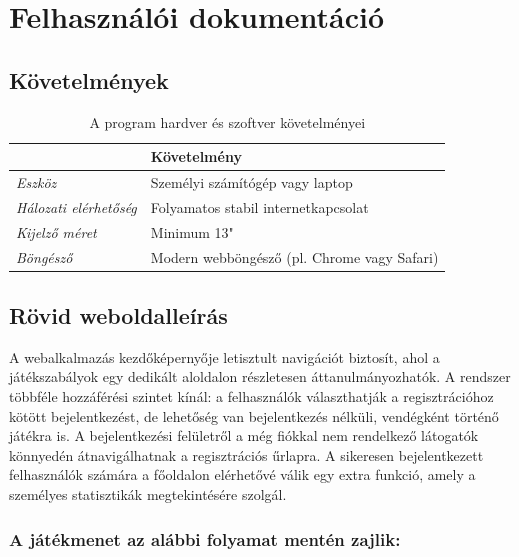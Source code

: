 \chapter{Felhasználói dokumentáció}
\label{ch:user}

\section{Követelmények}

\begin{table}[H]
	\centering
	\begin{tabular}{ | m{} | m{} | }
		\hline
		\textbf{} & \textbf{Követelmény} \\
		\hline \hline
		\emph{Eszköz} & Személyi számítógép vagy laptop \\
		\hline
		\emph{Hálozati elérhetőség} &  Folyamatos stabil internetkapcsolat \\
		\hline
		\emph{Kijelző méret} & Minimum 13" \\
		\hline
		\emph{Böngésző} & Modern webböngésző (pl. Chrome vagy Safari) \\
		\hline

	\end{tabular}
	\caption{A program hardver és szoftver követelményei}
	\label{tab:example-1}
\end{table}

\section{Rövid weboldalleírás}

A webalkalmazás kezdőképernyője letisztult navigációt biztosít, ahol a játékszabályok egy dedikált aloldalon részletesen áttanulmányozhatók. A rendszer többféle hozzáférési szintet kínál: a felhasználók választhatják a regisztrációhoz kötött bejelentkezést, de lehetőség van bejelentkezés nélküli, vendégként történő játékra is. A bejelentkezési felületről a még fiókkal nem rendelkező látogatók könnyedén átnavigálhatnak a regisztrációs űrlapra. A sikeresen bejelentkezett felhasználók számára a főoldalon elérhetővé válik egy extra funkció, amely a személyes statisztikák megtekintésére szolgál.

\subsection {A játékmenet az alábbi folyamat mentén zajlik:}

